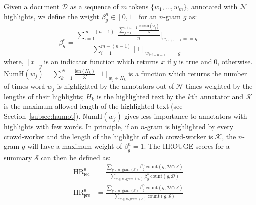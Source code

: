 \documentclass[11pt,a4paper]{article}
\begin{document}
Given a document $\mathcal{D}$ as a sequence of $m$ tokens $\{w_1, \ldots, w_m\}$, annotated with $\mathcal{N}$ highlights, we define the weight $\beta_g^n \in [0,1]$ for an $n$-gram $g$ as: 
\begin{equation}
    \beta_g^n = \frac{\displaystyle\sum_{i=1}^{m-(n-1)} \Bigg[\frac{\sum_{j=i}^{i+n-1} \frac{\mathrm{NumH}(w_j)}{\mathcal{N}}}{n}\Bigg]_{w_{i:i+n-1} == g}}{\displaystyle\sum_{i=1}^{m-(n-1)} [1]_{w_{i:i+n-1} == g} }
\end{equation}
\noindent where, $[x]_y$ is an indicator function which returns $x$ if $y$ is true and $0$, otherwise.  $\mathrm{NumH}(w_j) = \sum_{k=1}^{\mathcal{N}} \frac{\mathrm{len}(H_k)}{\mathcal{K}} [1]_{w_j \in H_k}$ is a function which returns the number of times word $w_j$ is highlighted by the annotators out of $\mathcal{N}$ times weighted by the lengths of their highlights; $H_k$ is the highlighted text by the $k$th annotator and  $\mathcal{K}$ is the maximum allowed length of the highlighted text (see Section~\ref{subsec:hannot}). $\mathrm{NumH}(w_j)$ gives less importance to  annotators with highlights with few words. In principle, if an $n$-gram is highlighted by every crowd-worker and the length of the highlight of each crowd-worker is $\mathcal{K}$, the $n$-gram $g$ will have a maximum weight of $\beta_g^n = 1$.
The HROUGE scores for a summary $\mathcal{S}$ can then be defined as:
\begin{align}
    \text{HR}_{\mathrm{rec}}^n &= \frac{\displaystyle\sum_{g \in n\operatorname{-gram}(\mathcal{S})} \beta_g^n\, \text{count}(g, \mathcal{D} \cap \mathcal{S})}{\displaystyle\sum_{g \in n\operatorname{-gram}(\mathcal{D})} \beta_g^n\,\text{count}(g, \mathcal{D})} \\
    \text{HR}_{\mathrm{pre}}^n &= \frac{\displaystyle\sum_{g \in n\operatorname{-gram}(\mathcal{S})} \beta_g^n\, \text{count}(g, \mathcal{D} \cap \mathcal{S})}{\displaystyle\sum_{g \in n\operatorname{-gram}(\mathcal{S})} \text{count}(g, \mathcal{S})}
\end{align}
\end{document}
